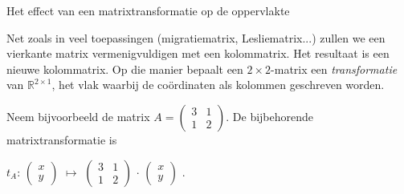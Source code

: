 \begin{lesactiviteit}{Het effect van een matrixtransformatie op de oppervlakte}
   
    
    Net zoals in veel toepassingen (migratiematrix, Lesliematrix...) zullen we een vierkante matrix vermenigvuldigen met een kolommatrix. Het resultaat is een nieuwe kolommatrix. Op die manier bepaalt een $2\times 2$-matrix een \emph{transformatie} van $\mathbb{R}^{2\times 1}$, het vlak waarbij de coördinaten als kolommen geschreven worden.

    Neem bijvoorbeeld  de matrix $A= 
    \begin{pmatrix}
    3 & 1\\ 
    1 & 2
    \end{pmatrix}$.
    De bijbehorende matrixtransformatie is
    
    $t_A$:
    $\begin{pmatrix}
    x \\ 
    y 
    \end{pmatrix}$
    $\mapsto$
    $\begin{pmatrix}
    3 & 1\\ 
    1 & 2
    \end{pmatrix}$
    $\cdot$
    $\begin{pmatrix}
    x \\ 
    y 
    \end{pmatrix}$
    .

    \begin{vraagenantwoord}

    

            

\end{vraagenantwoord}
\end{lesactiviteit}
